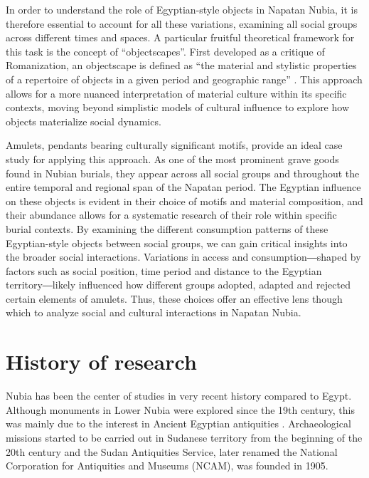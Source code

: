 In order to understand the role of Egyptian-style objects in Napatan Nubia, it is therefore essential to account for all these variations, examining all social groups across different times and spaces. A particular fruitful theoretical framework for this task is the concept of “objectscapes”. First developed as a critique of Romanization, an objectscape is defined as “the material and stylistic properties of a repertoire of objects in a given period and geographic range” \parencites[p.368]{pittsObjectscapesManifestoInvestigating2021}. This approach allows for a more nuanced interpretation of material culture within its specific contexts, moving beyond simplistic models of cultural influence to explore how objects materialize social dynamics.


Amulets, pendants bearing culturally significant motifs, provide an ideal case study for applying this approach. As one of the most prominent grave goods found in Nubian burials, they appear across all social groups and throughout the entire temporal and regional span of the Napatan period. The Egyptian influence on these objects is evident in their choice of motifs and material composition, and their abundance allows for a systematic research of their role within specific burial contexts. By examining the different consumption patterns of these Egyptian-style objects between social groups, we can gain critical insights into the broader social interactions. Variations in access and consumption―shaped by factors such as social position, time period and distance to the Egyptian territory―likely influenced how different groups adopted, adapted and rejected certain elements of amulets. Thus, these choices offer an effective lens though which to analyze social and cultural interactions in Napatan Nubia.


\section{History of research}


Nubia has been the center of studies in very recent history compared to Egypt. Although monuments in Lower Nubia were explored since the 19th century, this was mainly due to the interest in Ancient Egyptian antiquities \parencites[p.~3]{raueIntroduction2019}. Archaeological missions started to be carried out in Sudanese territory from the beginning of the 20th century and the Sudan Antiquities Service, later renamed the National Corporation for Antiquities and Museums (NCAM), was founded in 1905.


